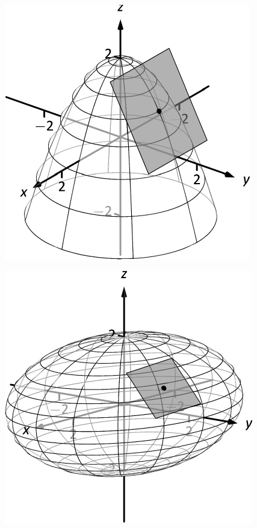 \documentclass[10pt]{article}
\begin{document}
\includegraphics{figtpl6_3DBW.pdf}
\texttt{}

\includegraphics{figtpl8_3DBW.pdf}
\texttt{}
\end{document}
